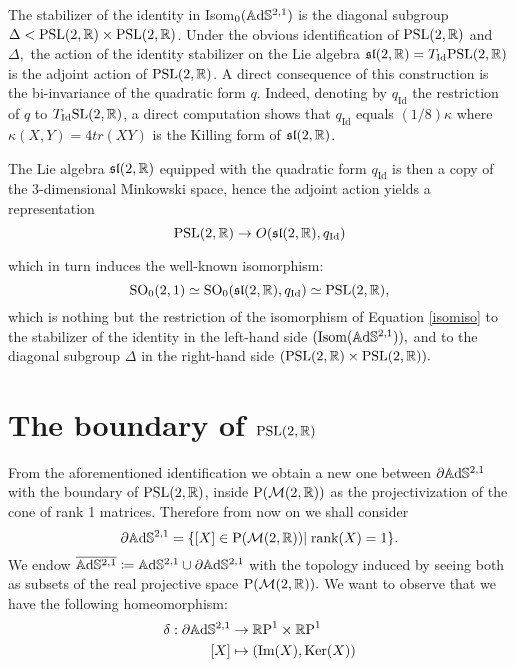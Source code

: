 The stabilizer of the identity in Isom$_0(\mathbb{A}\mathrm{d}\mathbb{S}^{2,1})$ is the diagonal subgroup $\Delta<\text{PSL}(2,\mathbb{R})\times\text{PSL}(2,\mathbb{R})$. Under the obvious identification of $\text{PSL}(2,\mathbb{R})$ and $\Delta,$ the action of the identity stabilizer on the Lie algebra $\mathfrak{sl}(2,\mathbb{R})=T_{\text{Id}}\text{PSL}(2,\mathbb{R})$ is the adjoint action of $\text{PSL}(2,\mathbb{R})$. A direct consequence of this construction is the bi-invariance of the quadratic form $q$. Indeed, denoting by $q_{\text{Id}}$ the restriction of $q$ to $T_{\text{Id}}\text{SL}(2,\mathbb{R})$, a direct computation shows that $q_\text{Id}$ equals $(1/8)\kappa$ where $\kappa(X,Y)=4tr(XY)$ is the Killing form of $\mathfrak{sl}(2, \mathbb{R})$.

\begin{observation}\label{311}
    The Lie algebra $\mathfrak{sl}(2,\mathbb{R})$ equipped with the quadratic form $q_{\text{Id}}$ is then a copy of the 3-dimensional Minkowski space, hence the adjoint action yields a representation 
    \[
        \text{PSL}(2,\mathbb{R})\to O(\mathfrak{sl}(2,\mathbb{R}),q_{\text{Id}})
    \]

which in turn induces the well-known isomorphism: 
\[
    \text{SO}_0(2,1)\simeq\text{SO}_0(\mathfrak{sl}(2,\mathbb{R}), q_\text{Id})\simeq \text{PSL}(2,\mathbb{R}),
\] which is nothing but the restriction of the isomorphism of Equation \ref{isomiso} to the stabilizer of the identity in the left-hand side $(\text{Isom}(\mathbb{A}\mathrm{d}\mathbb{S}^{2,1})),$ and to the diagonal subgroup $\Delta$ in the right-hand side $(\text{PSL}(2,\mathbb{R})\times\text{PSL}(2,\mathbb{R})).$
\end{observation}

\section{The boundary of $\text{PSL}(2,\mathbb{R})$} 
From the aforementioned identification we obtain a new one between $\partial\mathbb{A}\mathrm{d}\mathbb{S}^{2,1}$ with the boundary of $\text{PSL}(2,\mathbb{R})$, inside $\text{P}(\mathcal{M}(2,\mathbb{R}))$ as the projectivization of the cone of rank 1 matrices. Therefore from now on we shall consider 
\[
    \partial\mathbb{A}\mathrm{d}\mathbb{S}^{2,1}=\{[X]\in\text{P}(\mathcal{M}(2,\mathbb{R}))|\;\text{rank}(X)=1\}.
\]
We endow $\overline{\mathbb{A}\mathrm{d}\mathbb{S}^{2,1}}\coloneqq \mathbb{A}\mathrm{d}\mathbb{S}^{2,1}\cup\partial\mathbb{A}\mathrm{d}\mathbb{S}^{2,1}$ with the topology induced by seeing both as subsets of the real projective space $\text{P}(\mathcal{M}(2,\mathbb{R})).$ We want to observe that we have the following homeomorphism: 
\begin{align*}\label{delta}
    \delta:\partial\mathbb{A}\mathrm{d}\mathbb{S}^{2,1}&\rightarrow\mathbb{R}\text{P}^1\times\mathbb{R}\text{P}^1\\
    [X]&\mapsto (\text{Im}(X),\text{Ker}(X))
\end{align*}


